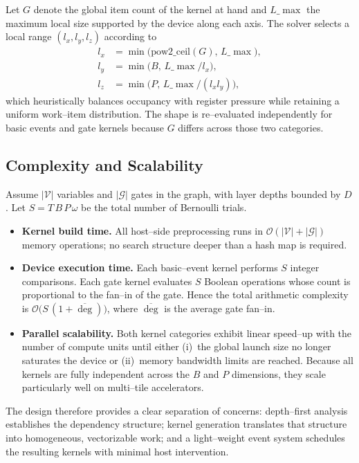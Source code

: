 Let $G$ denote the global item count of the kernel at hand and $L\_\max$ the
maximum local size supported by the device along each axis.  The solver
selects a local range $(l_x,l_y,l_z)$ according to
\begin{align*}
  l_x &= \min\bigl(\text{pow2\_ceil}(G),\,L\_\max\bigr),\\
  l_y &= \min\bigl(B,\,L\_\max/l_x\bigr),\\
  l_z &= \min\bigl(P,\,L\_\max/(l_x l_y)\bigr),
\end{align*}
which heuristically balances occupancy with register pressure while retaining a
uniform work--item distribution.  The shape is re--evaluated independently for
basic events and gate kernels because $G$ differs across those two categories.

\subsection{Complexity and Scalability}
\label{subsec:complexity}

Assume $|\mathcal{V}|$ variables and $|\mathcal{G}|$ gates in the graph, with
layer depths bounded by $D$.  Let $S=T\,B\,P\,\omega$ be the total number of
Bernoulli trials.
\begin{itemize}
  \item \textbf{Kernel build time.}  All host--side preprocessing runs in
        $\mathcal{O}(|\mathcal{V}|+|\mathcal{G}|)$ memory operations; no search
        structure deeper than a hash map is required.
  \item \textbf{Device execution time.}  Each basic--event kernel performs
        $S$ integer comparisons.  Each gate kernel evaluates $S$ Boolean
        operations whose count is proportional to the fan--in of the gate.
        Hence the total arithmetic complexity is
        $\mathcal{O}\bigl(S\,(1+\overline{\deg})\bigr)$, where
        $\overline{\deg}$ is the average gate fan--in.
  \item \textbf{Parallel scalability.}  Both kernel categories exhibit linear
        speed--up with the number of compute units until either (i)~the global
        launch size no longer saturates the device or (ii)~memory bandwidth
        limits are reached.  Because all kernels are fully independent across
        the $B$ and $P$ dimensions, they scale particularly well on
        multi--tile accelerators.
\end{itemize}

The design therefore provides a clear separation of concerns: depth--first
analysis establishes the dependency structure; kernel generation translates
that structure into homogeneous, vectorizable work; and a light--weight event
system schedules the resulting kernels with minimal host intervention.

